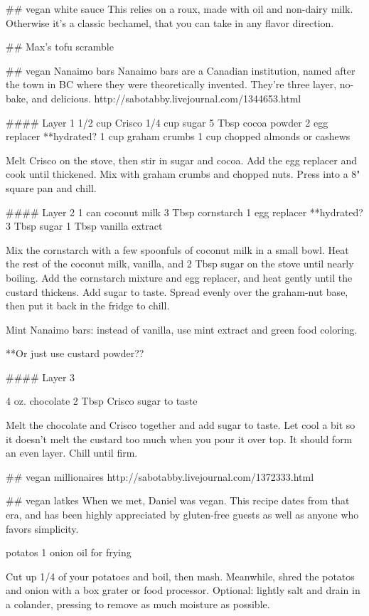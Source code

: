 ## vegan white sauce
This relies on a roux, made with oil and non-dairy milk. Otherwise it's a classic bechamel, that you can take in any flavor direction.



## Max's tofu scramble

## vegan Nanaimo bars
Nanaimo bars are a Canadian institution, named after the town in BC where they were theoretically invented. They're three layer, no-bake, and delicious.
http://sabotabby.livejournal.com/1344653.html

#### Layer 1
1/2 cup Crisco
1/4 cup sugar
5 Tbsp cocoa powder
2 egg replacer **hydrated?
1 cup graham crumbs
1 cup chopped almonds or cashews

Melt Crisco on the stove, then stir in sugar and cocoa. Add the egg replacer and cook until thickened. Mix with graham crumbs and chopped nuts. Press into a 8" square pan and chill.

#### Layer 2
1 can coconut milk
3 Tbsp cornstarch
1 egg replacer **hydrated?
3 Tbsp sugar
1 Tbsp vanilla extract

Mix the cornstarch with a few spoonfuls of coconut milk in a small bowl. Heat the rest of the coconut milk, vanilla, and 2 Tbsp sugar on the stove until nearly boiling. Add the cornstarch mixture and egg replacer, and heat gently until the custard thickens. Add sugar to taste. Spread evenly over the graham-nut base, then put it back in the fridge to chill.

Mint Nanaimo bars: instead of vanilla, use mint extract and green food coloring.

**Or just use custard powder??

#### Layer 3

4 oz. chocolate
2 Tbsp Crisco
sugar to taste

Melt the chocolate and Crisco together and add sugar to taste. Let cool a bit so it doesn't melt the custard too much when you pour it over top. It should form an even layer. Chill until firm.

## vegan millionaires
http://sabotabby.livejournal.com/1372333.html

## vegan latkes
When we met, Daniel was vegan. This recipe dates from that era, and has been highly appreciated by gluten-free guests as well as anyone who favors simplicity.

potatos
1 onion
oil for frying

Cut up 1/4 of your potatoes and boil, then mash. Meanwhile, shred the potatos and onion with a box grater or food processor. Optional: lightly salt and drain in a colander, pressing to remove as much moisture as possible.

